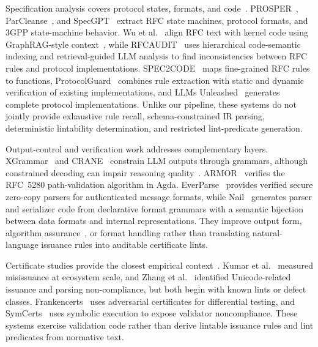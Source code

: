 Specification analysis covers protocol states, formats, and code~\cite{pacheco2022automated,yen2021sage}.
PROSPER~\cite{sharma2023prosper}, ParCleanse~\cite{zheng2025validating}, and
SpecGPT~\cite{zhang2025automated} extract RFC state machines, protocol formats,
and 3GPP state-machine behavior. Wu et al.~\cite{wu2025uncovering} align RFC text
with kernel code using GraphRAG-style context~\cite{lewis2020retrieval,edge2024local,peng2025graph},
while RFCAUDIT~\cite{zheng2025rfcaudit} uses hierarchical code-semantic indexing
and retrieval-guided LLM analysis to find inconsistencies between RFC rules and
protocol implementations. SPEC2CODE~\cite{wang2025spec2code} maps fine-grained
RFC rules to functions, ProtocolGuard~\cite{song2026protocolguard} combines rule
extraction with static and dynamic verification of existing implementations, and
LLMs Unleashed~\cite{long2026llms} generates complete protocol implementations.
Unlike our pipeline, these systems do not jointly provide exhaustive rule recall,
schema-constrained IR parsing, deterministic lintability determination, and
restricted lint-predicate generation.

Output-control and verification work addresses complementary layers.
XGrammar~\cite{dong2025xgrammar} and CRANE~\cite{banerjee2025crane} constrain LLM
outputs through grammars, although constrained decoding can impair reasoning
quality~\cite{schall2025hidden,park2024grammar}. ARMOR~\cite{debnath2024armor} verifies the
RFC~5280 path-validation algorithm in Agda. EverParse~\cite{ramananandro2019everparse}
provides verified secure zero-copy parsers for authenticated message formats, while
Nail~\cite{bangert2014nail} generates parser and serializer code from declarative
format grammars with a semantic bijection between data formats and internal representations.
They improve output form, algorithm assurance~\cite{debnath2021reengineering}, or
format handling rather than translating natural-language issuance rules into
auditable certificate lints.

Certificate studies provide the closest empirical context~\cite{durumeric2013analysis,georgiev2012most,amann2017mission,ma2021tracing,zhang2021rusted}. Kumar et
al.~\cite{kumar2018tracking} measured misissuance at ecosystem scale, and Zhang et
al.~\cite{zhang2025unicert} identified Unicode-related issuance and parsing
non-compliance, but both begin with known lints or defect classes.
Frankencerts~\cite{brubaker2014frankencerts} uses adversarial certificates for
differential testing, and SymCerts~\cite{chau2017symcerts} uses symbolic execution
to expose validator noncompliance. These systems exercise validation code rather
than derive lintable issuance rules and lint predicates from normative text.

